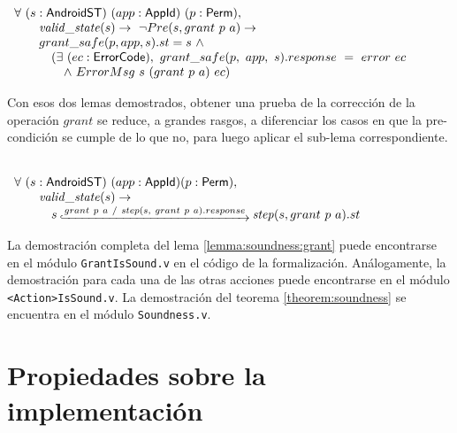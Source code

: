 \begin{lemma}
    \mbox{} \\
    $ \begin{array}[t]{l}
            \forall\ (s:\AndroidState)\ (app:\AppId)\ (p:\Perm),                                           \\
            \quad \quad \ap{valid\_state}{s} \rightarrow\ \neg Pre(s, grant\ p\ a) \rightarrow             \\
            \quad \quad grant\_safe(p, app, s).st = s\ \land                                               \\
            \quad \quad \quad (\exists\ (ec: \ErrorCode),\ grant\_safe(p,\ app,\ s).response\ =\ error\ ec \\
            \quad \quad \quad \quad \land\ ErrorMsg\ s\ (grant\ p\ a)\ ec)                                 \\
        \end{array} $
\end{lemma}

Con esos dos lemas demostrados, obtener una prueba de la corrección de la operación $grant$ se
reduce, a grandes rasgos, a diferenciar los casos en que la pre-condición se cumple de lo que no,
para luego aplicar el sub-lema correspondiente.

\begin{theorem}
     \label{lemma:soundness:grant}
    \mbox{} \\
    $ \begin{array}[t]{l}
            \forall\ (s:\AndroidState)\ (app:\AppId) (p:\Perm),                                                    \\
            \quad \quad \ap{valid\_state}{s} \rightarrow\                                                          \\
            \quad \quad \quad s\step{grant\ p\ a\ /\ step(s,\ grant\ p\ a).response} \bap{step}{s}{grant\ p\ a}.st \\
        \end{array} $
\end{theorem}

La demostración completa del lema \ref{lemma:soundness:grant} puede encontrarse en el módulo
\texttt{GrantIsSound.v} en el código de la formalización\cite{github-code}. Análogamente, la
demostración para cada una de las otras acciones puede encontrarse en el módulo
\texttt{<Action>IsSound.v}. La demostración del teorema \ref{theorem:soundness} se encuentra en el
módulo \texttt{Soundness.v}.

\section{Propiedades sobre la implementación}